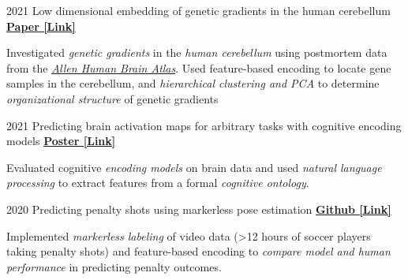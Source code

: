 \begin{cventries}
  \cventry
    {2021} %
    {Low dimensional embedding of genetic gradients in the human cerebellum} %
    {\href{https://papers.ssrn.com/sol3/papers.cfm?abstract_id=3797269}{\textbf{Paper [Link]}}}
    {}
    {
      \begin{cvitems} %
      	\item {Investigated \textit{genetic gradients} in the \textit{human cerebellum} using postmortem data from the \href{https://human.brain-map.org/}{\textit{Allen Human Brain Atlas}}. Used feature-based encoding to locate gene samples in the cerebellum, and \textit{hierarchical clustering and PCA} to determine \textit{organizational structure} of genetic gradients}
      \end{cvitems}
    }
    
  \cventry
    {2021} %
    {Predicting brain activation maps for arbitrary tasks with cognitive encoding models} %
    {\href{https://drive.google.com/file/d/1dRNSsRzGSSF9QJLJv_jK1R7BmmWfOsMt/view}{\textbf{Poster [Link]}}}
    {}
    {
      \begin{cvitems} %
      	\item {Evaluated cognitive \textit{encoding models} on brain data and used \textit{natural language processing} to extract features from a formal \textit{cognitive ontology}.}
      \end{cvitems}
    }   
    
    
  \cventry
    {2020} %
    {Predicting penalty shots using markerless pose estimation} %
    {\href{https://github.com/maedbhk/action_prediction}{\textbf{Github [Link]}}}
    {}
    {
      \begin{cvitems} %
      	\item {Implemented \textit{markerless labeling} of video data (>12 hours of soccer players taking penalty shots) and feature-based encoding to \textit{compare model and human performance} in predicting penalty outcomes.}
      \end{cvitems}
    }   
    

\end{cventries}
